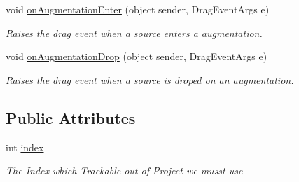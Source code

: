 \begin{DoxyCompactItemize}
void \hyperlink{class_preview_controller_a5d4e3df813540fd4ac0c74523f656fca}{on\-Augmentation\-Enter} (object sender, Drag\-Event\-Args e)
\begin{DoxyCompactList}\small\item\em Raises the drag event when a source enters a augmentation. \end{DoxyCompactList}\item 
void \hyperlink{class_preview_controller_a7bc01f6c09f310b7079a9754ec27e307}{on\-Augmentation\-Drop} (object sender, Drag\-Event\-Args e)
\begin{DoxyCompactList}\small\item\em Raises the drag event when a source is droped on an augmentation. \end{DoxyCompactList}\end{DoxyCompactItemize}
\subsection*{Public Attributes}
\begin{DoxyCompactItemize}
\item 
int \hyperlink{class_preview_controller_a9b9691005cc484c0da1d7498e72b8e7f}{index}
\begin{DoxyCompactList}\small\item\em The Index which Trackable out of Project we musst use \end{DoxyCompactList}\end{DoxyCompactItemize}
